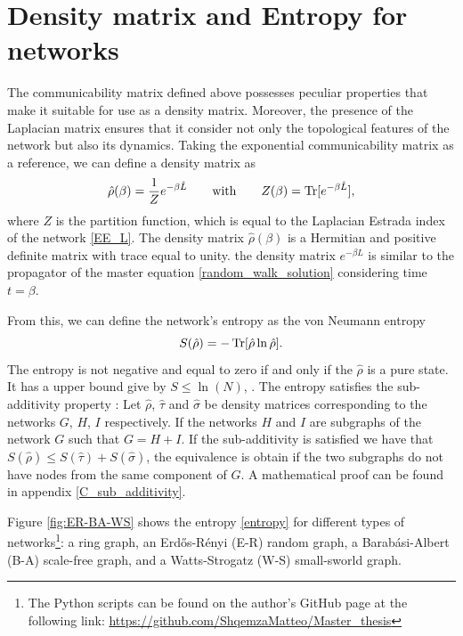 \section{Density matrix and Entropy for networks}
The communicability matrix defined above possesses peculiar properties that make it suitable for use as a density matrix. Moreover, the presence of the Laplacian matrix ensures that it consider not only the topological features of the network but also its dynamics. Taking the exponential communicability matrix as a reference, we can define a density matrix as
\begin{equation}\label{density_matrix}
    \hat \rho(\beta) = \frac{1}{Z} e^{-\beta \hat L} \qquad \text{with} \qquad Z(\beta) = \operatorname{Tr}[e^{-\beta \hat L}],
\end{equation}
where $Z$ is the partition function, which is equal to the Laplacian Estrada index of the network \eqref{EE_L}.
The density matrix $\hat \rho(\beta)$ is a Hermitian and positive definite matrix with trace equal to unity. 
the density matrix $e^{-\beta L}$ is similar to the propagator of the master equation \eqref{random_walk_solution} considering time $t = \beta$.

From this, we can define the network's entropy as the von Neumann entropy
\begin{equation} \label{entropy}
    S(\hat\rho) = -\operatorname{Tr}[\hat \rho \ln \hat \rho].
\end{equation}
The entropy is not negative and equal to zero if and only if the $\hat\rho$ is a pure state. It has a upper bound give by $S \leq \ln(N)$,  \cite{Nielsen_Chuang_2010}.
The entropy satisfies the sub-additivity property \cite{De_Domenico_2016}:
Let $\hat\rho$, $\hat\tau$ and $\hat\sigma$ be density matrices corresponding to the networks $G$, $H$, $I$ respectively. If the networks $H$ and $I$ are subgraphs of the network $G$ such that $G = H + I$.
If the sub-additivity is satisfied we have that $S(\hat\rho) \leq S(\hat\tau) + S(\hat\sigma)$, the equivalence is obtain if the two subgraphs do not have nodes from the same component of $G$. A mathematical proof can be found in appendix \ref{C_sub_additivity}.

Figure \ref{fig:ER-BA-WS} shows the entropy \eqref{entropy} for different types of networks\footnote{The Python scripts can be found on the author's GitHub page at the following link: \url{https://github.com/ShqemzaMatteo/Master_thesis}}: a ring graph, an Erd\H{o}s-Rényi (E-R) random graph, a Barab\'asi-Albert (B-A) scale-free graph, and a Watts-Strogatz (W-S) small-sworld graph.

